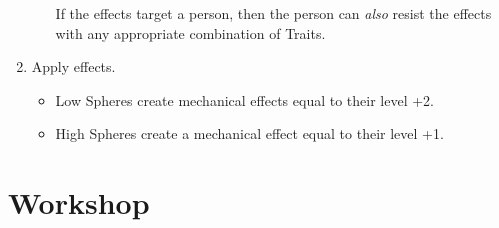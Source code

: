 \begin{multicols}{2}
\begin{enumerate}
\begin{itemize}
    If the effects target a person, then the person can \emph{also} resist the effects with any appropriate combination of Traits.
  \end{itemize}
  \item
  Apply effects.
  \begin{itemize}
    \item
    Low Spheres create mechanical effects equal to their level +2.
    \item
    High Spheres create a mechanical effect equal to their level +1.
  \end{itemize}
\end{enumerate}

\end{multicols}

\section{ Workshop}

